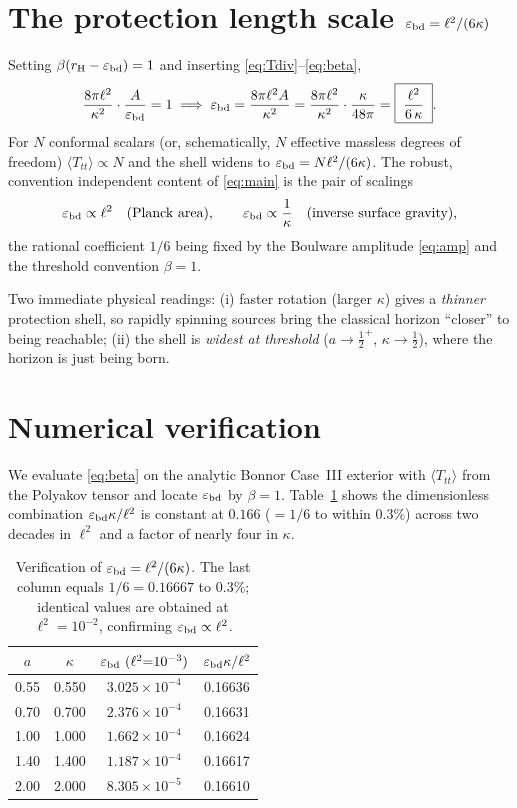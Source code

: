 \documentclass[11pt]{article}
\newcommand{\Ttt}{\langle T_{tt}\rangle}
\newcommand{\rH}{r_{\rm H}}
\newcommand{\ebd}{\varepsilon_{\rm bd}}
\begin{document}
\section{The protection length scale $\ebd=\ell^{2}/(6\kappa)$}
Setting $\beta(\rH-\ebd)=1$ and inserting \eqref{eq:Tdiv}--\eqref{eq:beta},
\begin{equation}
\frac{8\pi\ell^{2}}{\kappa^{2}}\cdot\frac{A}{\ebd}=1
\;\Longrightarrow\;
\ebd=\frac{8\pi\ell^{2}A}{\kappa^{2}}
=\frac{8\pi\ell^{2}}{\kappa^{2}}\cdot\frac{\kappa}{48\pi}
=\boxed{\;\frac{\ell^{2}}{6\,\kappa}\;}.
\label{eq:main}
\end{equation}
For $N$ conformal scalars (or, schematically, $N$ effective massless degrees of freedom)
$\Ttt\propto N$ and the shell widens to $\ebd=N\ell^{2}/(6\kappa)$. The robust, convention
independent content of \eqref{eq:main} is the pair of scalings
\begin{equation}
\ebd\propto\ell^{2}\quad(\text{Planck area}),\qquad
\ebd\propto\frac{1}{\kappa}\quad(\text{inverse surface gravity}),
\end{equation}
the rational coefficient $1/6$ being fixed by the Boulware amplitude \eqref{eq:amp} and the
threshold convention $\beta=1$.

Two immediate physical readings: (i) faster rotation (larger $\kappa$) gives a \emph{thinner}
protection shell, so rapidly spinning sources bring the classical horizon ``closer'' to being
reachable; (ii) the shell is \emph{widest at threshold} ($a\to\tfrac12^{+}$, $\kappa\to\tfrac12$),
where the horizon is just being born.

\section{Numerical verification}
We evaluate \eqref{eq:beta} on the analytic Bonnor Case~III exterior with $\Ttt$ from the
Polyakov tensor and locate $\ebd$ by $\beta=1$. Table~\ref{tab:verify} shows the dimensionless
combination $\ebd\kappa/\ell^{2}$ is constant at $0.166$ ($=1/6$ to within $0.3\%$) across two
decades in $\ell^{2}$ and a factor of nearly four in $\kappa$.

\begin{table}[h]
\centering
\begin{tabular}{cccc}
\toprule
$a$ & $\kappa$ & $\ebd\ (\ell^{2}{=}10^{-3})$ & $\ebd\kappa/\ell^{2}$\\
\midrule
0.55 & 0.550 & $3.025\times10^{-4}$ & 0.16636\\
0.70 & 0.700 & $2.376\times10^{-4}$ & 0.16631\\
1.00 & 1.000 & $1.662\times10^{-4}$ & 0.16624\\
1.40 & 1.400 & $1.187\times10^{-4}$ & 0.16617\\
2.00 & 2.000 & $8.305\times10^{-5}$ & 0.16610\\
\bottomrule
\end{tabular}
\caption{Verification of $\ebd=\ell^{2}/(6\kappa)$. The last column equals $1/6=0.16667$ to
$0.3\%$; identical values are obtained at $\ell^{2}=10^{-2}$, confirming $\ebd\propto\ell^{2}$.}
\label{tab:verify}
\end{table}
\end{document}
